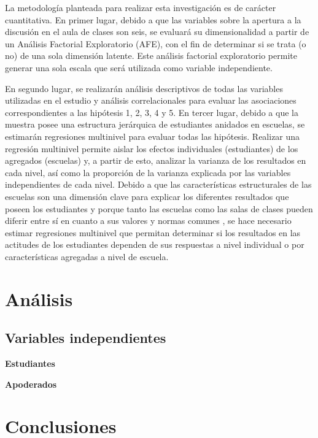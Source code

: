 \documentclass[12pt,twoside]{templates/facsothesis}
\begin{document}
La metodología planteada para realizar esta investigación es de carácter cuantitativa. En primer lugar, debido a que las variables sobre la apertura a la discusión en el aula de clases son seis, se evaluará su dimensionalidad a partir de un Análisis Factorial Exploratorio (AFE), con el fin de determinar si se trata (o no) de una sola dimensión latente. Este análisis factorial exploratorio permite generar una sola escala que será utilizada como variable independiente.

En segundo lugar, se realizarán análisis descriptivos de todas las variables utilizadas en el estudio y análisis correlacionales para evaluar las asociaciones correspondientes a las hipótesis 1, 2, 3, 4 y 5. En tercer lugar, debido a que la muestra posee una estructura jerárquica de estudiantes anidados en escuelas, se estimarán regresiones multinivel para evaluar todas las hipótesis. Realizar una regresión multinivel permite aislar los efectos individuales (estudiantes) de los agregados (escuelas) y, a partir de esto, analizar la varianza de los resultados en cada nivel, así como la proporción de la varianza explicada por las variables independientes de cada nivel. Debido a que las características estructurales de las escuelas son una dimensión clave para explicar los diferentes resultados que poseen los estudiantes \citep{trevino_Influence_2018} y porque tanto las escuelas como las salas de clases pueden diferir entre sí en cuanto a sus valores y normas comunes \citep{bayramozdemir_How_2020}, se hace necesario estimar regresiones multinivel que permitan determinar si los resultados en las actitudes de los estudiantes dependen de sus respuestas a nivel individual o por características agregadas a nivel de escuela.

\hypertarget{anuxe1lisis}{%
\chapter{Análisis}\label{anuxe1lisis}}

\hypertarget{variables-independientes}{%
\section{Variables independientes}\label{variables-independientes}}

\textbf{Estudiantes}

\textbf{Apoderados}

\hypertarget{conclusiones}{%
\chapter{Conclusiones}\label{conclusiones}}
\end{document}
